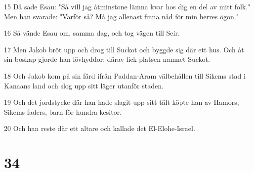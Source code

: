 \par 15 Då sade Esau: "Så vill jag åtminstone lämna kvar hos dig en del av mitt folk." Men han svarade: "Varför så? Må jag allenast finna nåd för min herres ögon."
\par 16 Så vände Esau om, samma dag, och tog vägen till Seir.
\par 17 Men Jakob bröt upp och drog till Suckot och byggde sig där ett hus. Och åt sin boskap gjorde han lövhyddor; därav fick platsen namnet Suckot.
\par 18 Och Jakob kom på sin färd ifrån Paddan-Aram välbehållen till Sikems stad i Kanaans land och slog upp sitt läger utanför staden.
\par 19 Och det jordstycke där han hade slagit upp sitt tält köpte han av Hamors, Sikems faders, barn för hundra kesitor.
\par 20 Och han reste där ett altare och kallade det El-Elohe-Israel.

\chapter{34}


